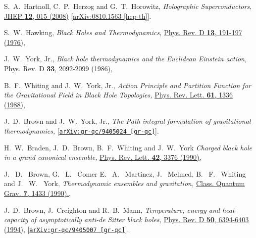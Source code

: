 \documentclass[pr, twocolumn, preprintnumbers, showpacs,footnoteadded, superscriptaddress,nofootinbib,longbibliography]{revtex4-1}
\begin{document}
\begin{thebibliography}{99}
S.~A.~Hartnoll, C.~P.~Herzog and G.~T.~Horowitz,
\emph{Holographic Superconductors},
\href{https://iopscience.iop.org/article/10.1088/1126-6708/2008/12/015}{JHEP \textbf{12}, 015 (2008)}
[\href{https://arxiv.org/pdf/0810.1563.pdf}{arXiv:0810.1563 [hep-th]}].

S.~W.~Hawking,
\emph{Black Holes and Thermodynamics,}
\href{http://dx.doi.org/10.1103/PhysRevD.13.191}{Phys. Rev. D {\textbf{13}, 191-197 (1976)}},

J.~W.~York, Jr.,
\emph{Black hole thermodynamics and the Euclidean Einstein action,}
\href{http://dx.doi.org/10.1103/PhysRevD.33.2092}{Phys. Rev. D \textbf{33}, 2092-2099 (1986)},

B.~F.~Whiting and J.~W.~York, Jr.,
\emph{Action Principle and Partition Function for the Gravitational Field in Black Hole Topologies,}
\href{http://dx.doi.org/10.1103/PhysRevLett.61.1336}{Phys. Rev. Lett. \textbf{61}, 1336 (1988)},

J.~D.~Brown and J.~W.~York, Jr.,
\emph{The Path integral formulation of gravitational thermodynamics,}
[\href{http://arxiv.org/abs/gr-qc/9405024}{{\tt arXiv:gr-qc/9405024 [gr-qc]}}].


H.~W.~Braden, J.~D.~Brown, B.~F.~Whiting and J.~W.~York
\emph{Charged black hole in a grand canonical ensemble,}
\href{http://dx.doi.org/10.1103/PhysRevD.42.3376}{Phys. Rev. Lett. \textbf{42}, 3376 (1990)},



J.~ D.~ Brown, G.~ L.~ Comer E.~ A.~ Martinez, J.~ Melmed, B.~ F.~ Whiting and J.~ W.~ York,
\emph{Thermodynamic ensembles and gravitation,}
\href{http://dx.doi.org/10.1088/0264-9381/7/8/020}{Class. Quantum Grav. \textbf{7}, 1433 (1990).},


J.~D.~Brown, J.~Creighton and R.~B.~Mann,
\emph{Temperature, energy and heat capacity of asymptotically anti-de Sitter black holes,}
\href{http://dx.doi.org/10.1103/PhysRevD.50.6394}{Phys. Rev. D \textbf{50}, 6394-6403 (1994)},
[\href{http://arxiv.org/abs/gr-qc/9405007}{{\tt arXiv:gr-qc/9405007 [gr-qc]}}].



\end{thebibliography}
\end{document}
